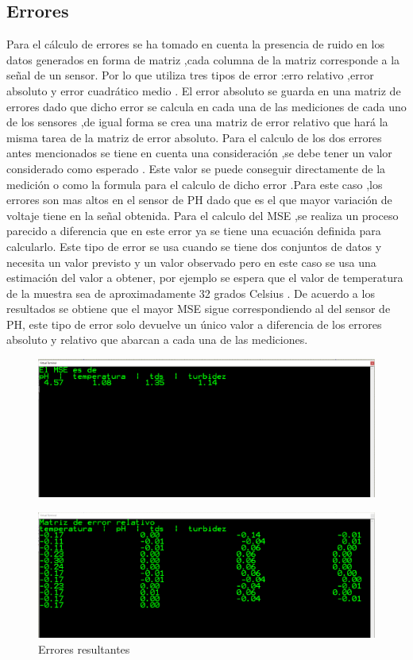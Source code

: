 \documentclass[10pt,a4paper]{article}
\begin{document}
\subsection{Errores}
Para el cálculo de errores se ha tomado en cuenta la presencia de ruido en los datos generados en forma de matriz ,cada columna de la matriz corresponde a la señal de un sensor. Por lo que utiliza tres tipos de error :erro relativo ,error absoluto y error cuadrático medio .
El error absoluto se guarda en una matriz de errores dado que dicho error se calcula en cada una de las mediciones de cada uno de los sensores ,de igual forma se crea una matriz de error relativo que hará la misma tarea de la matriz de error absoluto. Para el calculo de los dos errores antes mencionados se tiene en cuenta una consideración ,se debe tener un valor considerado como esperado .
Este valor se puede conseguir directamente de la medición o como la formula para el calculo de dicho error .Para este caso ,los errores son mas altos en el sensor de PH dado que es el que mayor variación de voltaje tiene en la señal obtenida.
Para el calculo del MSE ,se realiza un proceso parecido a diferencia que en este error ya se tiene una ecuación definida para calcularlo. Este tipo de error se usa cuando se tiene dos conjuntos de datos y necesita un valor previsto y un valor observado pero en este caso se usa una estimación del valor a obtener, por ejemplo se espera que el valor de temperatura de la muestra sea de aproximadamente 32 grados Celsius .
De acuerdo a los resultados se obtiene que el mayor MSE sigue correspondiendo al del sensor de PH, este tipo de error solo devuelve un único valor a diferencia de los errores absoluto y relativo que abarcan a cada una de las mediciones.
\begin{figure}[H]
\centering
\includegraphics[scale=0.30]{MSE.png}
\end{figure}
\begin{figure}[H]
\centering
\includegraphics[scale=0.30]{Errorabsrlt.png}
\caption{Errores resultantes }
\end{figure}
\end{document}
